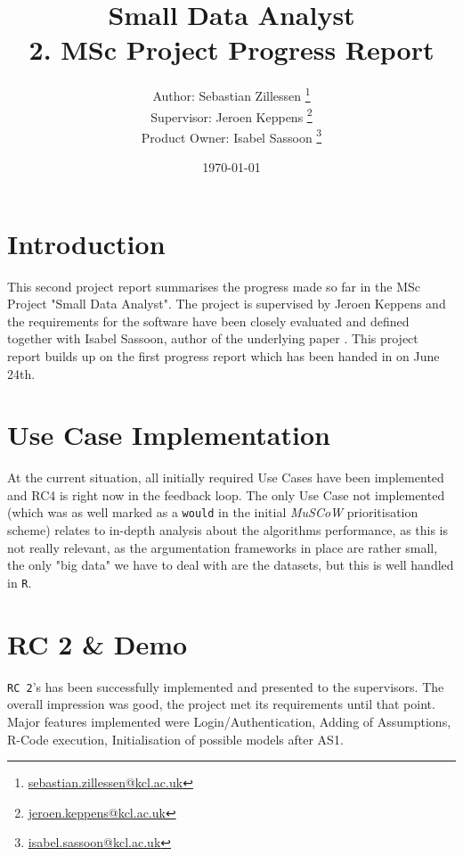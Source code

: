 \documentclass[11pt,twocolumn]{article}
\begin{document}
\title{
Small Data Analyst 
\protect\\ 
2. MSc Project Progress Report
}
\author{
Author:  \hfill Sebastian Zillessen \thanks{\href{mailto:sebastian.zillessen@kcl.ac.uk}{sebastian.zillessen@kcl.ac.uk}}\\
Supervisor: \hfill Jeroen Keppens \thanks{\href{mailto:jeroen.keppens@kcl.ac.uk}{jeroen.keppens@kcl.ac.uk}}\\
Product Owner: \hfill Isabel Sassoon \thanks{\href{mailto:isabel.sassoon@kcl.ac.uk}{isabel.sassoon@kcl.ac.uk}}
}
\date{\today}
\maketitle


\section{Introduction}
This second project report summarises the progress made so far in the MSc Project "Small Data Analyst". The project is supervised by Jeroen \mbox{Keppens} and the requirements for the software have been closely evaluated and defined together with Isabel Sassoon, author of the underlying paper \cite{sassoon2014}. This project report builds up on the first progress report which has been handed in on June 24th. 

\section{ Use Case Implementation}
At the current situation, all initially required Use Cases have been implemented and RC4 is right now in the feedback loop. The only Use Case not implemented (which was as well marked as a \texttt{would} in the initial \textit{MuSCoW} prioritisation scheme) relates to in-depth analysis about the algorithms performance, as this is not really relevant, as the argumentation frameworks in place are rather small, the only "big data" we have to deal with are the datasets, but this is well handled in \texttt{R}.

\section{ RC 2 \& Demo}
\texttt{RC 2}'s has been successfully implemented and presented to the supervisors. The overall impression was good, the project met its requirements until that point. Major features implemented were Login/Authentication, Adding of Assumptions, R-Code execution, Initialisation of possible models after AS1.
\end{document}

